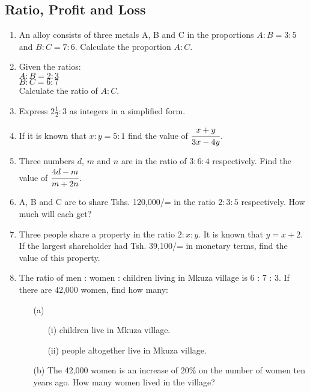 \subsection{Ratio, Profit and Loss}
\begin{enumerate}

		\subsubsection{Ratio}
	\item An alloy consists of three metals A, B and C in the proportions $A:B = 3:5$ and $B:C = 7:6$. Calculate the proportion $A:C$.		
		
	\item Given the ratios:\\
	$A : B = 2 : 3$\\
	$B : C = 6 : 7$\\
	Calculate the ratio of $A : C$.
	
	\item Express $2\frac{1}{2} : 3$ as integers in a simplified form.
	
	\item If it is known that $x:y = 5:1$ find the value of $\cfrac{x + y}{3x - 4y}$.
	
	\item Three numbers $d$, $m$ and $n$ are in the ratio of $3:6:4$ respectively. Find the value of $\cfrac{4d - m}{m + 2n}$.
	
	\item A, B and C are to share Tshs. 120,000/= in the ratio $2:3:5$ respectively. How much will each get?
	
	\item Three people share a property in the ratio $2:x:y$. It is known that $y = x + 2$. If the largest shareholder had Tsh. 39,100/= in monetary terms, find the value of this property.
	
	\item The ratio of men : women : children living in Mkuza village is 6 : 7 : 3. If there are 42,000 women, find how many:
		\begin{itemize}
		\item[(a)]
			\begin{itemize}
			\item[(i)] children live in Mkuza village.
			\item[(ii)] people altogether live in Mkuza village.
			\end{itemize}
		\item[(b)] The 42,000 women is an increase of 20\% on the number of women ten years ago. How many women lived in the village?
		\end{itemize}
		

\end{enumerate}
